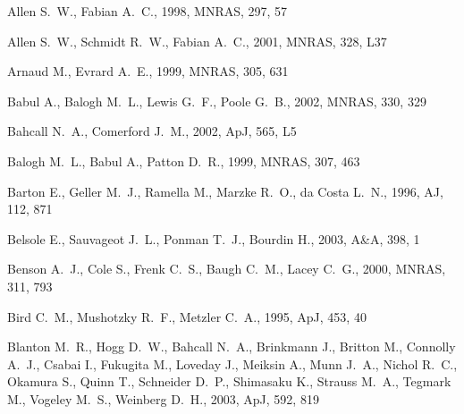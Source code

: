 \documentclass[usenatbib]{mn2e}
\begin{document}
\begin{thebibliography}{}

Allen S.~W.,  Fabian A.~C.,  1998, MNRAS, 297, 57

Allen S.~W.,  Schmidt R.~W.,    Fabian A.~C.,  2001, MNRAS, 328, L37

Arnaud M.,  Evrard A.~E.,  1999, MNRAS, 305, 631

Babul A.,  Balogh M.~L.,  Lewis G.~F.,    Poole G.~B.,  2002, MNRAS, 330, 329

Bahcall N.~A.,  Comerford J.~M.,  2002, ApJ, 565, L5

Balogh M.~L.,  Babul A.,    Patton D.~R.,  1999, MNRAS, 307, 463

Barton E.,  Geller M.~J.,  Ramella M.,  Marzke R.~O.,    da Costa L.~N.,  1996,
  AJ, 112, 871

Belsole E.,  Sauvageot J.~L.,  Ponman T.~J.,    Bourdin H.,  2003, A\&A, 398, 1

Benson A.~J.,  Cole S.,  Frenk C.~S.,  Baugh C.~M.,    Lacey C.~G.,  2000,
  MNRAS, 311, 793

Bird C.~M.,  Mushotzky R.~F.,    Metzler C.~A.,  1995, ApJ, 453, 40

Blanton M.~R.,  Hogg D.~W.,  Bahcall N.~A.,  Brinkmann J.,  Britton M.,
  Connolly A.~J.,  Csabai I.,  Fukugita M.,  Loveday J.,  Meiksin A.,  Munn
  J.~A.,  Nichol R.~C.,  Okamura S.,  Quinn T.,  Schneider D.~P.,  Shimasaku
  K.,  Strauss M.~A.,  Tegmark M.,  Vogeley M.~S.,    Weinberg D.~H.,  2003,
  ApJ, 592, 819


\end{thebibliography}
\end{document}
